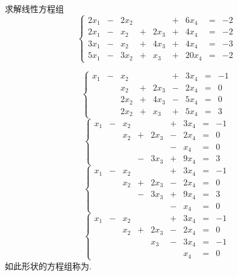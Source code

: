 \begin{li}
  求解线性方程组
  $$
  \left\{
  \begin{array}{rcrcrcrcrr}
    2x_1 & - & 2x_2 &   &      & + &  6x_4 & = &-2 \\[0.1cm]
    2x_1 & - &  x_2 & + & 2x_3 & + &  4x_4 & = &-2 \\[0.1cm]
    3x_1 & - &  x_2 & + & 4x_3 & + &  4x_4 & = &-3 \\[0.1cm]
    5x_1 & - & 3x_2 & + &  x_3 & + & 20x_4 & = &-2 
  \end{array}
  \right.
  $$
\end{li}
\begin{jie}
  $$
  \left\{
  \begin{array}{rcrcrcrcrr}
    x_1 & - &  x_2 &   &      & + &  3x_4 & = &-1 \\[0.1cm]
    &  &  x_2 & + & 2x_3 & - &  2x_4 & = &0 \\[0.1cm]
    &  & 2x_2 & + & 4x_3 & - &  5x_4 & = &0 \\[0.1cm]
    &  & 2x_2 & + &  x_3 & + &  5x_4 & = &3 
  \end{array}
  \right.
  $$    
  $$
  \left\{
  \begin{array}{rcrcrcrcrr}
    x_1 & - &  x_2 &   &      & + &  3x_4 & = &-1 \\[0.1cm]
    &  &  x_2 & + & 2x_3 & - &  2x_4 & = &0 \\[0.1cm]
    &  &  &  &  & - &  x_4 & = &0 \\[0.1cm]
    &  &  & - &  3x_3 & + &  9x_4 & = &3 
  \end{array}
  \right.
  $$    
  $$
  \left\{
  \begin{array}{rcrcrcrcrr}
    x_1 & - &  x_2 &   &      & + &  3x_4 & = &-1 \\[0.1cm]
    &  &  x_2 & + & 2x_3 & - &  2x_4 & = &0 \\[0.1cm]
    &  &  & - &  3x_3 & + &  9x_4 & = &3 \\[0.1cm]
    &  &  &  &  & - &  x_4 & = &0 
  \end{array}
  \right.
  $$    
  $$
  \left\{
  \begin{array}{rcrcrcrcrr}
    x_1 & - &  x_2 &   &      & + &  3x_4 & = &-1 \\[0.1cm]
    &  &  x_2 & + & 2x_3 & - &  2x_4 & = &0 \\[0.1cm]
    &  &  &  &  x_3 & - &  3x_4 & = &-1 \\[0.1cm]
    &  &  &  &  &  &  x_4 & = &0 
  \end{array}
  \right.
  $$    
  如此形状的方程组称为.

\end{jie}
